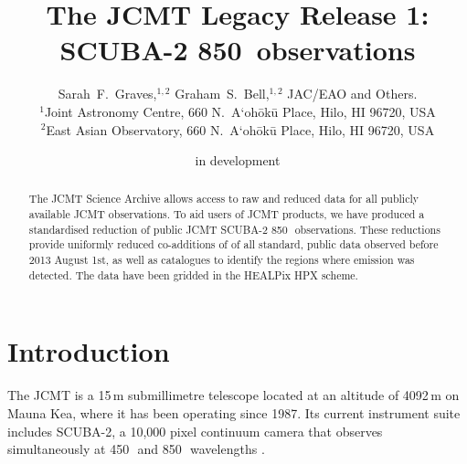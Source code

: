 \documentclass[usenatbib]{mnras}
\title[SCUBA-2 850\um\ Legacy Release]%
{The JCMT Legacy Release 1: SCUBA-2 850\bmicron\ observations}
\author[S.~F.~Graves et~al.]
{Sarah~F.~Graves,$^{1,2}$
Graham~S.~Bell,$^{1,2}$
JAC/EAO
and
Others.\\
$^1$Joint Astronomy Centre, 660 N.\ A`oh\=ok\=u Place, Hilo, HI 96720, USA\\
$^2$East Asian Observatory, 660 N.\ A`oh\=ok\=u Place, Hilo, HI 96720, USA
}
\newcommand{\um}{\micron}
\begin{document}
\date{in development}

\pagerange{\pageref{firstpage}--\pageref{lastpage}} 

\maketitle

\label{firstpage}

\begin{abstract}
  The JCMT Science Archive allows access to raw and reduced data for
  all publicly available JCMT observations. To aid users of JCMT
  products, we have produced a standardised reduction of public JCMT
  SCUBA-2 850\,\um\ observations. These reductions provide
  uniformly reduced co-additions of of all standard, public data
  observed before 2013 August 1st, as well as catalogues to identify
  the regions where emission was detected. The data have been gridded
  in the HEALPix HPX scheme.
\end{abstract}

\section{Introduction}

The JCMT is a 15\,m submillimetre telescope located at an altitude of
4092\,m on Mauna Kea, where it has been operating since
1987. Its current instrument suite includes SCUBA-2, a 10,000
pixel continuum camera that observes simultaneously at 450\,\um\ and
850\,\um\ wavelengths \citep{Holland2013}.
\end{document}
